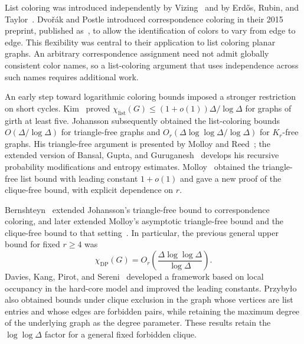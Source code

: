 List coloring was introduced independently by Vizing~\cite{Vizing1976}
and by Erd\H{o}s, Rubin, and Taylor~\cite{ErdosRubinTaylor1980}.
Dvo\v{r}\'ak and Postle introduced correspondence coloring in their
2015 preprint, published as~\cite{DvorakPostle}, to allow the
identification of colors to vary from edge to edge. This flexibility
was central to their application to list coloring planar graphs.
An arbitrary correspondence assignment need not admit globally
consistent color names, so a list-coloring argument that uses
independence across such names requires additional work.

An early step toward logarithmic coloring bounds imposed a stronger
restriction on short cycles. Kim~\cite{Kim1995} proved
$\chi_{\mathrm{list}}(G)\le(1+o(1))\Delta/\log\Delta$ for graphs
of girth at least five. Johansson subsequently obtained the list-coloring bounds
$O(\Delta/\log\Delta)$ for triangle-free graphs and
$O_r(\Delta\log\log\Delta/\log\Delta)$ for $K_r$-free graphs.
His triangle-free argument is presented by Molloy and
Reed~\cite[Chapter~13]{MolloyReed2002}; the extended version of
Bansal, Gupta, and Guruganesh~\cite[Sections~6--9]{BansalGuptaGuruganesh2018}
develops his recursive probability modifications and entropy estimates.
Molloy~\cite[Theorems~1 and~2]{Molloy2019} obtained the
triangle-free list bound with leading constant $1+o(1)$ and gave a new
proof of the clique-free bound, with explicit dependence on $r$.

Bernshteyn~\cite{Bernshteyn2016} extended Johansson's triangle-free
bound to correspondence coloring, and later extended Molloy's
asymptotic triangle-free bound and the clique-free bound to that
setting~\cite[Theorems~1.3 and~1.5]{Bernshteyn2019}. In particular,
the previous general upper bound for fixed $r\ge4$ was
\[
 \chi_{\mathrm{DP}}(G)
 =O_r\!\left(\frac{\Delta\log\log\Delta}{\log\Delta}\right).
\]
Davies, Kang, Pirot, and Sereni~\cite[Theorem~30]{DKPSLocalOccupancy}
developed a framework based on local occupancy in the hard-core model
and improved the leading constants. Przyby\l o~\cite[Theorem~10]{Przybylo2024}
also obtained bounds under clique exclusion in the graph whose vertices
are list entries and whose edges are forbidden pairs, while retaining
the maximum degree of the underlying graph as the degree parameter.
These results retain the
$\log\log\Delta$ factor for a general fixed forbidden clique.

